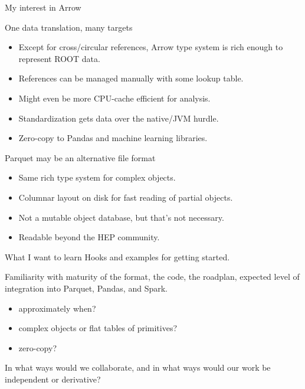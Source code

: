 \documentclass{beamer}
\begin{document}
\begin{frame}{My interest in Arrow}
\vspace{0.4 cm}
\begin{block}{One data translation, many targets}
\begin{itemize}
\item Except for cross/circular references, Arrow type system is rich enough to represent ROOT data.
\item References can be managed manually with some lookup table.
\item Might even be more CPU-cache efficient for analysis.
\item Standardization gets data over the native/JVM hurdle.
\item Zero-copy to Pandas and machine learning libraries.
\end{itemize}
\end{block}

\begin{block}{Parquet may be an alternative file format}
\begin{itemize}
\item Same rich type system for complex objects.
\item Columnar layout on disk for fast reading of partial objects.
\item Not a mutable object database, but that's not necessary.
\item Readable beyond the HEP community.
\end{itemize}
\end{block}
\end{frame}

\begin{frame}{What I want to learn}
\vspace{0.5 cm}
Hooks and examples for getting started.

\vspace{1 cm}
Familiarity with maturity of the format, the code, the roadplan, expected level of integration into Parquet, Pandas, and Spark.
\begin{itemize}
\item approximately when?
\item complex objects or flat tables of primitives?
\item zero-copy?
\end{itemize}

\vspace{1 cm}
In what ways would we collaborate, and in what ways would our work be independent or derivative?
\end{frame}
\end{document}
